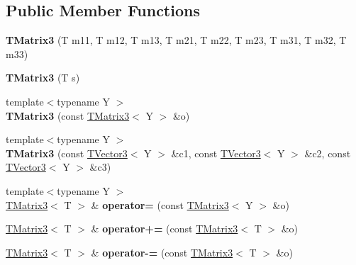 \subsection*{Public Member Functions}
\begin{DoxyCompactItemize}
\item 
{\bfseries T\+Matrix3} (T m11, T m12, T m13, T m21, T m22, T m23, T m31, T m32, T m33)\hypertarget{classAudio_1_1TMatrix3_a8e737fb4ffa7697814af80b0e8e359c3}{}\label{classAudio_1_1TMatrix3_a8e737fb4ffa7697814af80b0e8e359c3}

\item 
{\bfseries T\+Matrix3} (T s)\hypertarget{classAudio_1_1TMatrix3_a243d3cb3d5b594cb0c7cca10c3a04bac}{}\label{classAudio_1_1TMatrix3_a243d3cb3d5b594cb0c7cca10c3a04bac}

\item 
{\footnotesize template$<$typename Y $>$ }\\{\bfseries T\+Matrix3} (const \hyperlink{classAudio_1_1TMatrix3}{T\+Matrix3}$<$ Y $>$ \&o)\hypertarget{classAudio_1_1TMatrix3_acb942861c62b3a2ad11ab789d74df7e4}{}\label{classAudio_1_1TMatrix3_acb942861c62b3a2ad11ab789d74df7e4}

\item 
{\footnotesize template$<$typename Y $>$ }\\{\bfseries T\+Matrix3} (const \hyperlink{classAudio_1_1TVector3}{T\+Vector3}$<$ Y $>$ \&c1, const \hyperlink{classAudio_1_1TVector3}{T\+Vector3}$<$ Y $>$ \&c2, const \hyperlink{classAudio_1_1TVector3}{T\+Vector3}$<$ Y $>$ \&c3)\hypertarget{classAudio_1_1TMatrix3_add027469ff0b600ebaec4f112899244d}{}\label{classAudio_1_1TMatrix3_add027469ff0b600ebaec4f112899244d}

\item 
{\footnotesize template$<$typename Y $>$ }\\\hyperlink{classAudio_1_1TMatrix3}{T\+Matrix3}$<$ T $>$ \& {\bfseries operator=} (const \hyperlink{classAudio_1_1TMatrix3}{T\+Matrix3}$<$ Y $>$ \&o)\hypertarget{classAudio_1_1TMatrix3_a81a3cc5dc3b61e8a810acc22bcca2315}{}\label{classAudio_1_1TMatrix3_a81a3cc5dc3b61e8a810acc22bcca2315}

\item 
\hyperlink{classAudio_1_1TMatrix3}{T\+Matrix3}$<$ T $>$ \& {\bfseries operator+=} (const \hyperlink{classAudio_1_1TMatrix3}{T\+Matrix3}$<$ T $>$ \&o)\hypertarget{classAudio_1_1TMatrix3_aeee0d1ab03fc1f3ee0edae544d89070d}{}\label{classAudio_1_1TMatrix3_aeee0d1ab03fc1f3ee0edae544d89070d}

\item 
\hyperlink{classAudio_1_1TMatrix3}{T\+Matrix3}$<$ T $>$ \& {\bfseries operator-\/=} (const \hyperlink{classAudio_1_1TMatrix3}{T\+Matrix3}$<$ T $>$ \&o)\hypertarget{classAudio_1_1TMatrix3_a46107681295b9f5c2af78cf7d1fa0348}{}\label{classAudio_1_1TMatrix3_a46107681295b9f5c2af78cf7d1fa0348}


\end{DoxyCompactItemize}
